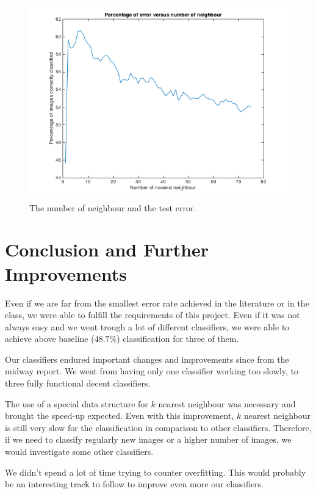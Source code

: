 \documentclass{article} %
\begin{document}
\begin{figure}
\centering
\includegraphics[scale=0.5]{kChoice.png}
\caption{The number of neighbour and the test error. }
\end{figure}






\section{Conclusion and Further Improvements}

Even if we are far from the smallest error rate achieved in the literature or in the class, we were able to fulfill the requirements of this project. Even if it was not always easy and  we went trough a lot of different classifiers, we were able to achieve above baseline ($48.7\%$) classification for three of them.

Our classifiers endured important changes and improvements since from the midway report. We went from having only one classifier working too slowly, to three fully functional decent classifiers.

The use of a special data structure for $k$ nearest neighbour was necessary and brought the speed-up expected. Even with this improvement, $k$ nearest neighbour is still very slow for the classification in comparison to other classifiers. Therefore, if we need to classify regularly new images or a higher number of images, we would investigate some other classifiers.

We didn't spend a lot of time trying to counter overfitting. This would probably be an interesting track to follow to improve even more our classifiers. 
\end{document}
